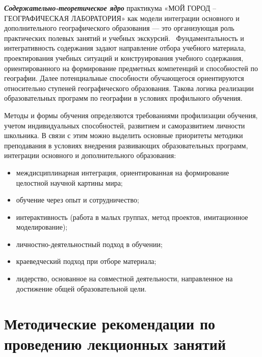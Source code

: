 \documentclass[
  11pt,
  russian,
]{book}
\begin{document}
\textbf{\emph{Содержательно-теоретическое ядро}} практикума «МОЙ ГОРОД -- ГЕОГРАФИЧЕСКАЯ ЛАБОРАТОРИЯ» как модели интеграции основного и дополнительного географического образования --- это организующая роль практических полевых занятий и учебных экскурсий.~ Фундаментальность и интегративность содержания задают направление отбора учебного материала, проектирования учебных ситуаций и конструирования учебного содержания, ориентированного на формирование предметных компетенций и способностей по географии. Далее потенциальные способности обучающегося ориентируются относительно ступеней географического образования. Такова логика реализации образовательных программ по географии в условиях профильного обучения.

Методы и формы обучения определяются требованиями профилизации обучения, учетом индивидуальных способностей, развитием и саморазвитием личности школьника. В связи с этим можно выделить основные приоритеты методики преподавания в условиях внедрения развивающих образовательных программ, интеграции основного и дополнительного образования:

\begin{itemize}
\item
  междисциплинарная интеграция, ориентированная на формирование целостной научной картины мира;
\item
  обучение через опыт и сотрудничество;
\item
  интерактивность (работа в малых группах, метод проектов, имитационное моделирование);
\item
  личностно-деятельностный подход в обучении;
\item
  краеведческий подход при отборе материала;
\item
  лидерство, основанное на совместной деятельности, направленное на достижение общей образовательной цели.
\end{itemize}

\hypertarget{ux43cux435ux442ux43eux434ux438ux447ux435ux441ux43aux438ux435-ux440ux435ux43aux43eux43cux435ux43dux434ux430ux446ux438ux438-ux43fux43e-ux43fux440ux43eux432ux435ux434ux435ux43dux438ux44e-ux43bux435ux43aux446ux438ux43eux43dux43dux44bux445-ux437ux430ux43dux44fux442ux438ux439}{%
\section*{Методические рекомендации по проведению лекционных занятий}\label{ux43cux435ux442ux43eux434ux438ux447ux435ux441ux43aux438ux435-ux440ux435ux43aux43eux43cux435ux43dux434ux430ux446ux438ux438-ux43fux43e-ux43fux440ux43eux432ux435ux434ux435ux43dux438ux44e-ux43bux435ux43aux446ux438ux43eux43dux43dux44bux445-ux437ux430ux43dux44fux442ux438ux439}}
\end{document}
